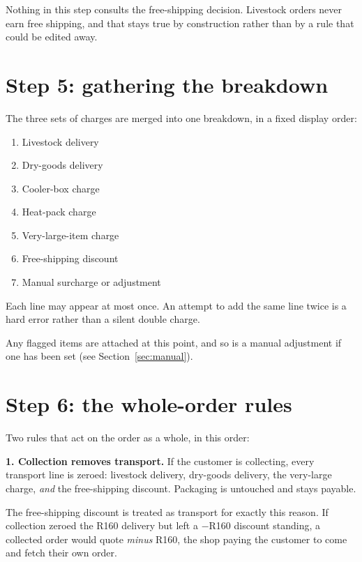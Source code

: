 \documentclass[11pt,a4paper,oneside]{report}
\newcommand{\R}[1]{R#1}
\begin{document}
\begin{houseinfo}
Nothing in this step consults the free-shipping decision. Livestock orders never earn
free shipping, and that stays true by construction rather than by a rule that could
be edited away.
\end{houseinfo}

\section{Step 5: gathering the breakdown}

The three sets of charges are merged into one breakdown, in a fixed display order:

\begin{enumerate}[label=\arabic*.]
  \item Livestock delivery
  \item Dry-goods delivery
  \item Cooler-box charge
  \item Heat-pack charge
  \item Very-large-item charge
  \item Free-shipping discount
  \item Manual surcharge or adjustment
\end{enumerate}

Each line may appear at most once. An attempt to add the same line twice is a hard
error rather than a silent double charge.

Any flagged items are attached at this point, and so is a manual adjustment if one
has been set (see Section~\ref{sec:manual}).

\section{Step 6: the whole-order rules}
\label{sec:step6}

Two rules that act on the order as a whole, in this order:

\textbf{1. Collection removes transport.} If the customer is collecting, every
transport line is zeroed: livestock delivery, dry-goods delivery, the very-large
charge, \emph{and} the free-shipping discount. Packaging is untouched and stays
payable.

\begin{houseinfo}
The free-shipping discount is treated as transport for exactly this reason. If
collection zeroed the \R{160} delivery but left a $-$\R{160} discount standing, a
collected order would quote \emph{minus} \R{160}, the shop paying the customer to
come and fetch their own order.
\end{houseinfo}
\end{document}
